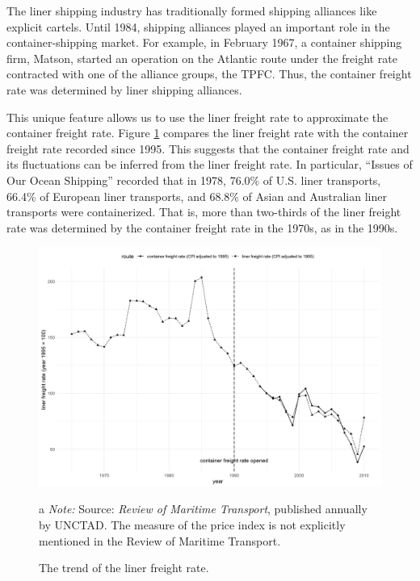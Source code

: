 The liner shipping industry has traditionally formed shipping alliances like explicit cartels. Until 1984, shipping alliances played an important role in the container-shipping market. For example, in February 1967, a container shipping firm, Matson, started an operation on the Atlantic route under the freight rate contracted with one of the alliance groups, the TPFC. Thus, the container freight rate was determined by liner shipping alliances.

This unique feature allows us to use the liner freight rate to approximate the container freight rate. Figure \ref{fg:liner_freight_rate} compares the liner freight rate with the container freight rate recorded since 1995. This suggests that the container freight rate and its fluctuations can be inferred from the liner freight rate. In particular, “Issues of Our Ocean Shipping” recorded that in 1978, 76.0\%  of U.S. liner transports, 66.4\% of European liner transports, and 68.8\% of Asian and Australian liner transports were containerized. That is, more than two-thirds of the liner freight rate was determined by the container freight rate in the 1970s, as in the 1990s.


\begin{figure}[!ht]
\begin{center}
\includegraphics[height = 0.4\textheight]{figuretable/liner_freight_rate.png}
\end{center}
\caption{The trend of the liner freight rate.}
\begin{tablenotes}
\item[a]\textit{Note:} Source: \textit{Review of Maritime Transport}, published annually by UNCTAD. The measure of the price index is not explicitly mentioned in the Review of Maritime Transport.
\end{tablenotes}
\label{fg:liner_freight_rate}
\end{figure}


